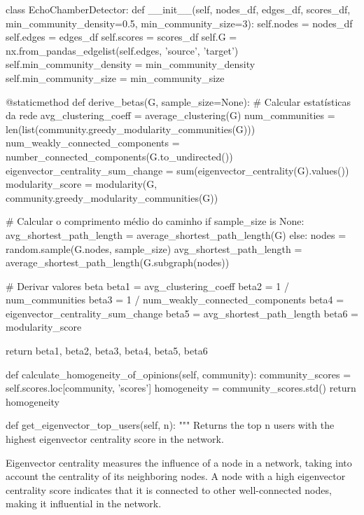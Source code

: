 \begin{codigo}[caption={Exemplo de classe Python para deteção de câmaras de eco}, label={codigo:echochamberdetector}, language=Python, breaklines=true]
    class EchoChamberDetector:
    def __init__(self, nodes_df, edges_df, scores_df, min_community_density=0.5, min_community_size=3):
        self.nodes = nodes_df
        self.edges = edges_df
        self.scores = scores_df
        self.G = nx.from_pandas_edgelist(self.edges, 'source', 'target')
        self.min_community_density = min_community_density
        self.min_community_size = min_community_size

    @staticmethod
    def derive_betas(G, sample_size=None):
        # Calcular estatísticas da rede
        avg_clustering_coeff = average_clustering(G)
        num_communities = len(list(community.greedy_modularity_communities(G)))
        num_weakly_connected_components = number_connected_components(G.to_undirected())
        eigenvector_centrality_sum_change = sum(eigenvector_centrality(G).values())
        modularity_score = modularity(G, community.greedy_modularity_communities(G))

        # Calcular o comprimento médio do caminho
        if sample_size is None:
            avg_shortest_path_length = average_shortest_path_length(G)
        else:
            nodes = random.sample(G.nodes, sample_size)
            avg_shortest_path_length = average_shortest_path_length(G.subgraph(nodes))

        # Derivar valores beta
        beta1 = avg_clustering_coeff
        beta2 = 1 / num_communities
        beta3 = 1 / num_weakly_connected_components
        beta4 = eigenvector_centrality_sum_change
        beta5 = avg_shortest_path_length
        beta6 = modularity_score

        return beta1, beta2, beta3, beta4, beta5, beta6
    
    def calculate_homogeneity_of_opinions(self, community):
        community_scores = self.scores.loc[community, 'scores']
        homogeneity = community_scores.std()
        return homogeneity

    def get_eigenvector_top_users(self, n):
        """
        Returns the top n users with the highest eigenvector centrality score in the network.

        Eigenvector centrality measures the influence of a node in a network, taking into account the centrality of its
        neighboring nodes. A node with a high eigenvector centrality score indicates that it is connected to other
        well-connected nodes, making it influential in the network.


\end{codigo}
